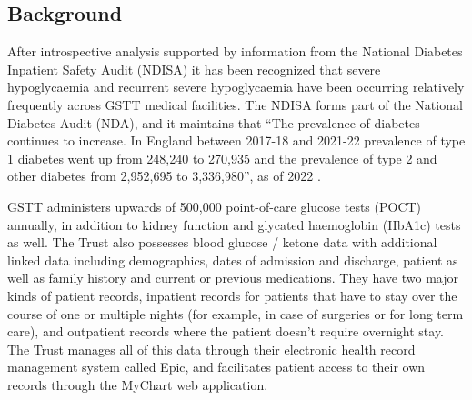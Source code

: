 \subsection{Background} 
\par{\noindent After introspective analysis supported by information from the National Diabetes Inpatient Safety Audit (NDISA) it has been recognized that severe hypoglycaemia and recurrent severe hypoglycaemia have been occurring relatively frequently across GSTT medical facilities. The NDISA forms part of the National Diabetes Audit (NDA), and it maintains that “The prevalence of diabetes continues to increase. In England between 2017-18 and 2021-22 prevalence of type 1 diabetes went up from 248,240 to 270,935 and the prevalence of type 2 and other diabetes from 2,952,695 to 3,336,980”, as of 2022  \cite{nationaldiabetesaudit22}. }

\vspace{10pt}
\par{\noindent GSTT administers upwards of 500,000 point-of-care glucose tests (POCT) annually, in addition to kidney function and glycated haemoglobin (HbA1c) tests as well. The Trust also possesses blood glucose / ketone data with additional linked data including demographics, dates of admission and discharge, patient as well as family history and current or previous medications. They have two major kinds of patient records, inpatient records for patients that have to stay over the course of one or multiple nights (for example, in case of surgeries or for long term care), and outpatient records where the patient doesn’t require overnight stay. The Trust manages all of this data through their electronic health record management system called Epic, and facilitates patient access to their own records through the MyChart web application.}

